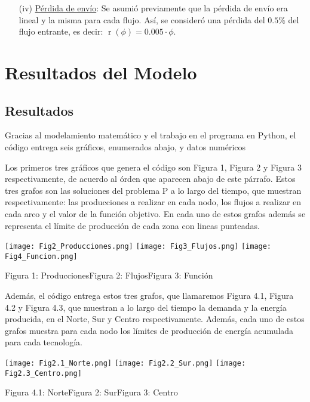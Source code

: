 \documentclass[12pt,twoside]{article}
\begin{document}
\begin{itemize}
		\item [(iv)] \underline{P\'erdida de env\'io}: Se asumi\'o previamente que la p\'erdida de env\'io era lineal y la misma para cada flujo. As\'i, se consider\'o una p\'erdida del \(0.5\%\) del flujo entrante, es decir: \(\operatorname{r}(\phi)=0.005\cdot\phi\).
	\end{itemize}
	\section{Resultados del Modelo}
	\subsection{Resultados}
	
	\hspace{1cm} Gracias al modelamiento matemático y el trabajo en el programa en Python, el c\'odigo entrega seis gr\'aficos, enumerados abajo, y datos num\'ericos 
	
	\hspace{1cm} Los primeros tres gr\'aficos que genera el c\'odigo son Figura 1, Figura 2 y Figura 3 respectivamente, de acuerdo al \'orden que aparecen abajo de este p\'arrafo. Estos tres grafos son las soluciones del problema P a lo largo del tiempo, que muestran respectivamente: las producciones a realizar en cada nodo, los flujos a realizar en cada arco y el valor de la funci\'on objetivo. En cada uno de estos grafos adem\'as se representa el l\'imite de producci\'on de cada zona con lineas punteadas.
	
	\texttt{[image: Fig2\_Producciones.png]}
	\texttt{[image: Fig3\_Flujos.png]}
	\texttt{[image: Fig4\_Funcion.png]}
	\begin{center}Figura 1: Producciones\hspace{2.5cm}Figura 2: Flujos\hspace{2.7cm}Figura 3: Funci\'on\hspace{0.5cm}\, \end{center}
	
	\hspace{1cm} Adem\'as, el c\'odigo entrega estos tres grafos, que llamaremos Figura 4.1, Figura 4.2 y Figura 4.3, que muestran a lo largo del tiempo la demanda y la energ\'ia producida, en el Norte, Sur y Centro respectivamente. Adem\'as, cada uno de estos grafos muestra para cada nodo los l\'imites de producci\'on de energ\'ia acumulada para cada tecnolog\'ia.
	
	\texttt{[image: Fig2.1\_Norte.png]}
	\texttt{[image: Fig2.2\_Sur.png]}
	\texttt{[image: Fig2.3\_Centro.png]}
	\begin{center}Figura 4.1: Norte\hspace{3.2cm}Figura 2: Sur\hspace{3.2cm}Figura 3: Centro \end{center}
	
\end{document}
